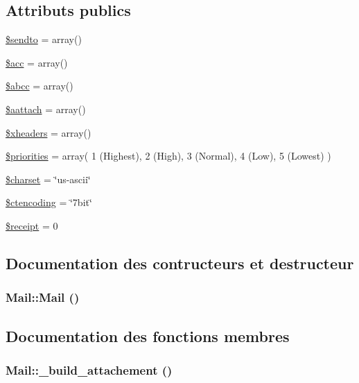\subsection*{Attributs publics}
\begin{CompactItemize}
\item 
\hyperlink{classMail_o0}{\$sendto} = array()
\item 
\hyperlink{classMail_o1}{\$acc} = array()
\item 
\hyperlink{classMail_o2}{\$abcc} = array()
\item 
\hyperlink{classMail_o3}{\$aattach} = array()
\item 
\hyperlink{classMail_o4}{\$xheaders} = array()
\item 
\hyperlink{classMail_o5}{\$priorities} = array( 1 (Highest), 2 (High), 3 (Normal), 4 (Low), 5 (Lowest) )
\item 
\hyperlink{classMail_o6}{\$charset} = \char`\"{}us-ascii\char`\"{}
\item 
\hyperlink{classMail_o7}{\$ctencoding} = \char`\"{}7bit\char`\"{}
\item 
\hyperlink{classMail_o8}{\$receipt} = 0
\end{CompactItemize}


\subsection{Documentation des contructeurs et destructeur}
\hypertarget{classMail_a0}{
\subsubsection[Mail]{\setlength{\rightskip}{0pt plus 5cm}Mail::Mail ()}}
\label{classMail_a0}




\subsection{Documentation des fonctions membres}
\hypertarget{classMail_a18}{
\subsubsection[\_\-build\_\-attachement]{\setlength{\rightskip}{0pt plus 5cm}Mail::\_\-build\_\-attachement ()}}
\label{classMail_a18}


